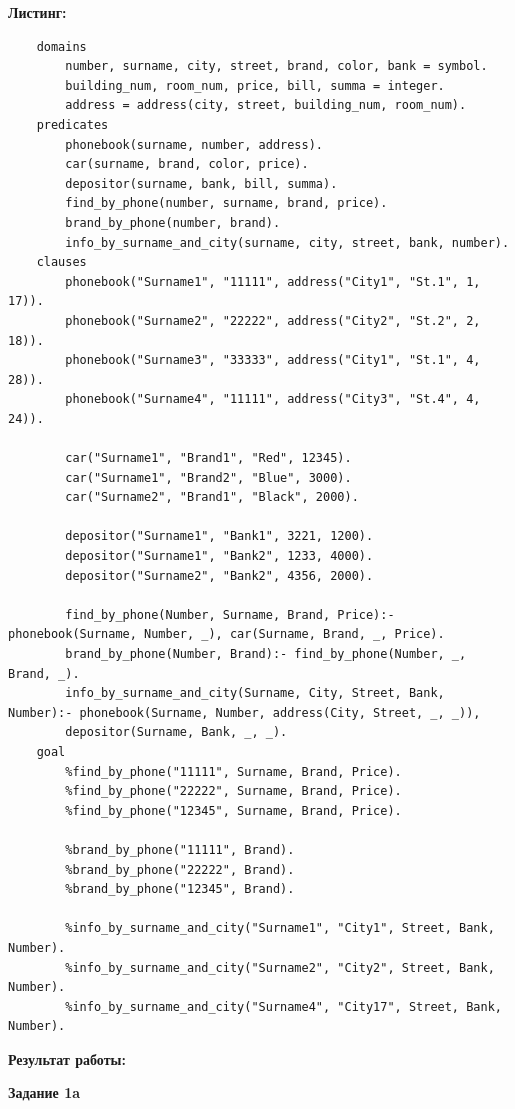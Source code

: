 \documentclass[12pt, a4paper]{extarticle}
\begin{document}
\newpage
\textbf{Листинг:}
\begin{lstlisting}
	domains
		number, surname, city, street, brand, color, bank = symbol.
		building_num, room_num, price, bill, summa = integer.
		address = address(city, street, building_num, room_num).	
	predicates
		phonebook(surname, number, address).
		car(surname, brand, color, price).
		depositor(surname, bank, bill, summa).
		find_by_phone(number, surname, brand, price).
		brand_by_phone(number, brand).
		info_by_surname_and_city(surname, city, street, bank, number).
	clauses
		phonebook("Surname1", "11111", address("City1", "St.1", 1, 17)).
		phonebook("Surname2", "22222", address("City2", "St.2", 2, 18)).
		phonebook("Surname3", "33333", address("City1", "St.1", 4, 28)).
		phonebook("Surname4", "11111", address("City3", "St.4", 4, 24)).
		
		car("Surname1", "Brand1", "Red", 12345).
		car("Surname1", "Brand2", "Blue", 3000).
		car("Surname2", "Brand1", "Black", 2000).
		
		depositor("Surname1", "Bank1", 3221, 1200).
		depositor("Surname1", "Bank2", 1233, 4000).
		depositor("Surname2", "Bank2", 4356, 2000).	
		
		find_by_phone(Number, Surname, Brand, Price):- phonebook(Surname, Number, _), car(Surname, Brand, _, Price).
		brand_by_phone(Number, Brand):- find_by_phone(Number, _, Brand, _).
		info_by_surname_and_city(Surname, City, Street, Bank, Number):- phonebook(Surname, Number, address(City, Street, _, _)),
		depositor(Surname, Bank, _, _).
	goal
		%find_by_phone("11111", Surname, Brand, Price).
		%find_by_phone("22222", Surname, Brand, Price).
		%find_by_phone("12345", Surname, Brand, Price).
		
		%brand_by_phone("11111", Brand).
		%brand_by_phone("22222", Brand).
		%brand_by_phone("12345", Brand).
		
		%info_by_surname_and_city("Surname1", "City1", Street, Bank, Number).
		%info_by_surname_and_city("Surname2", "City2", Street, Bank, Number).
		%info_by_surname_and_city("Surname4", "City17", Street, Bank, Number).
\end{lstlisting}

\newpage
\textbf{Результат работы:}\par

\textbf{Задание 1a} \par
\begin{figure}[h!]	
\end{figure}\par
\end{document}

